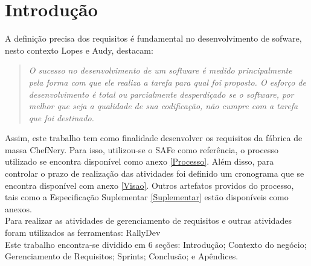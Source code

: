 
\chapter[Introdução]{Introdução}

A definição precisa dos requisitos é fundamental  no desenvolvimento de sofware, nesto contexto Lopes e  Audy, destacam:

\begin{quotation}
\textit{O sucesso no desenvolvimento de um software é medido principalmente pela forma com que ele realiza a tarefa para qual foi proposto. O esforço de desenvolvimento é total ou parcialmente desperdiçado se o software, por melhor que seja a qualidade de sua codificação, não cumpre com a tarefa que foi destinado.}
\end{quotation}

Assim, este trabalho tem como finalidade desenvolver os requisitos da fábrica de massa ChefNery. Para isso, utilizou-se o SAFe como referência, o processo utilizado se encontra disponível como anexo \ref{Processo}.  Além disso, para controlar o prazo de realização das atividades foi definido um cronograma que se encontra disponível com anexo \ref{Visao}. Outros artefatos providos do processo, tais como a Especificação Suplementar \ref{Suplementar} estão disponíveis como anexos. \\
\tab Para realizar as atividades de gerenciamento de requisitos e outras atividades foram utilizados as ferramentas: RallyDev \\
\tab  Este trabalho encontra-se dividido em 6 seções: Introdução; Contexto do negócio; Gerenciamento de Requisitos; Sprints; Conclusão; e Apêndices.\\